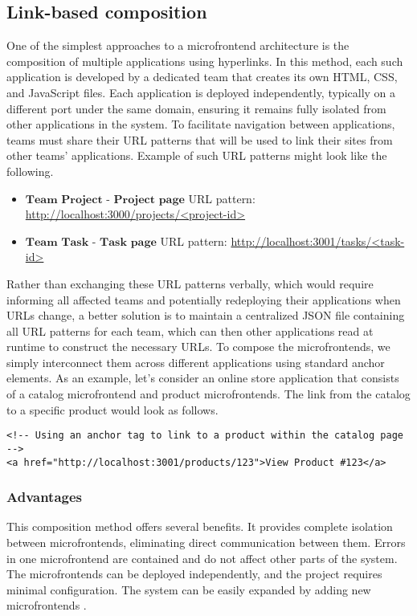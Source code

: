 \subsection{Link-based composition}
One of the simplest approaches to a microfrontend architecture is the composition of multiple applications using hyperlinks. In this method, each such application is developed by a dedicated team that creates its own HTML, CSS, and JavaScript files. Each application is deployed independently, typically on a different port under the same domain, ensuring it remains fully isolated from other applications in the system. To facilitate navigation between applications, teams must share their URL patterns that will be used to link their sites from other teams' applications.\cite{MicrofrontendsInAction}\cite{MFPatterns} Example of such URL patterns might look like the following.
\begin{itemize}
\item $\textbf{Team Project - Project page}$ \newline
URL pattern: \url{http://localhost:3000/projects/<project-id>}
\item $\textbf{Team Task - Task page}$ \newline
URL pattern: \url{http://localhost:3001/tasks/<task-id>}
\end{itemize}

\noindent
Rather than exchanging these URL patterns verbally, which would require informing all affected teams and potentially redeploying their applications when URLs change, a better solution is to maintain a centralized JSON file containing all URL patterns for each team, which can then other applications read at runtime to construct the necessary URLs. To compose the microfrontends, we simply interconnect them across different applications using standard anchor elements. As an example, let's consider an online store application that consists of a catalog microfrontend and product microfrontends. The link from the catalog to a specific product would look as follows.
\begin{verbatim}
<!-- Using an anchor tag to link to a product within the catalog page 
-->
<a href="http://localhost:3001/products/123">View Product #123</a>
\end{verbatim}

\subsubsection{Advantages}
This composition method offers several benefits. It provides complete isolation between microfrontends, eliminating direct communication between them. Errors in one microfrontend are contained and do not affect other parts of the system. The microfrontends can be deployed independently, and the project requires minimal configuration. The system can be easily expanded by adding new microfrontends \cite{MicrofrontendsInAction}.

